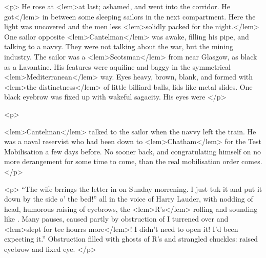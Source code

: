 {{				<p>
					He rose at 
<lem>at last; ashamed, and went into the corridor. He got</lem>
						{} 
 					in between some 
					sleeping sailors in the next compartment. Here the light was uncovered and the men 
					less 
<lem>solidly packed for the night.</lem>
						{} 
					One sailor opposite 
<lem>Cantelman</lem>
						{} 
					was awake, filling his pipe, 
					and talking to a navvy. They were not talking about the war, but the mining industry. 
					The sailor was a 
<lem>Scotsman</lem>
						{} 
					from near Glasgow, as black as a Lavantine. His features 
					were aquiline and baggy in the symmetrical 
<lem>Mediterranean</lem> 
						{} 
					way. Eyes heavy, brown, blank, 
					and formed with 
<lem>the distinctness</lem>
						{} 
					of little billiard balls, lids like metal slides. One black 
					eyebrow was fixed up with wakeful sagacity. His eyes were 
						{} 
 				</p>

				<p>
					
<lem>Cantelman</lem>
						{} 
					talked to the sailor when the navvy left the train. He was a naval reservist 
					who had been down to 
<lem>Chatham</lem>
						{} 
					for the Test Mobilisation a few days before. No sooner 
					back, and congratulating himself on no more derangement for some time to come, than 
					the real mobilisation order comes. 
				</p>

				<p>
					“The wife brrings the letter in on Sunday morrening. I just tuk it and put it down 
					by the side o' the bed!” all in the voice of Harry Lauder, with nodding of head, 
					humorous raising of eyebrows, the 
<lem>R's</lem>{} rolling and sounding like . 
					Many pauses, caused partly by obstruction of 
						{} 
					I turrened over and 
<lem>slept for tee hourrs more</lem>{}! 
					I didn't need to open it! 
					I'd been expecting it.” Obstruction filled with ghosts of R's and strangled chuckles: 
					raised eyebrow and fixed eye. 
				</p>

}}
